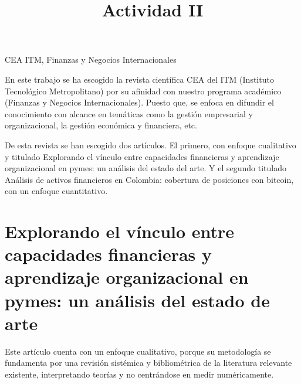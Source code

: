 \documentclass[conference]{IEEEtran}
\begin{document}
\title{Actividad II\\}

\author{
	\and
}

\maketitle




\begin{IEEEkeywords}
	CEA ITM, Finanzas y Negocios Internacionales
\end{IEEEkeywords}

\nocite{*}

En este trabajo se ha escogido la revista científica CEA del ITM (Instituto
Tecnológico Metropolitano) por su afinidad con nuestro programa académico
(Finanzas y Negocios Internacionales). Puesto que, se enfoca en difundir el
conocimiento con alcance en temáticas como la gestión empresarial y
organizacional, la gestión económica y financiera, etc.

De esta revista se han escogido dos artículos. El primero, con enfoque
cualitativo y titulado Explorando el vínculo entre capacidades financieras y
aprendizaje organizacional en pymes: un análisis del estado del arte. Y el
segundo titulado Análisis de activos financieros en Colombia: cobertura de
posiciones con bitcoin, con un enfoque cuantitativo.

\section*{Explorando el vínculo entre capacidades financieras y aprendizaje organizacional en pymes: un análisis del estado de arte}

Este artículo cuenta con un enfoque cualitativo, porque su metodología se
fundamenta por una revisión sistémica y bibliométrica de la literatura
relevante existente, interpretando teorías y no centrándose en medir
numéricamente.
\end{document}
